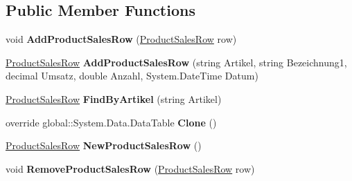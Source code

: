 \subsection*{Public Member Functions}
\begin{DoxyCompactItemize}
\item 
void {\bfseries Add\+Product\+Sales\+Row} (\hyperlink{class_products_1_1_data_1_1ds_sage_1_1_product_sales_row}{Product\+Sales\+Row} row)\hypertarget{class_products_1_1_data_1_1ds_sage_1_1_product_sales_data_table_afc99a0a7a97b04db18da66f97cf320fb}{}\label{class_products_1_1_data_1_1ds_sage_1_1_product_sales_data_table_afc99a0a7a97b04db18da66f97cf320fb}

\item 
\hyperlink{class_products_1_1_data_1_1ds_sage_1_1_product_sales_row}{Product\+Sales\+Row} {\bfseries Add\+Product\+Sales\+Row} (string Artikel, string Bezeichnung1, decimal Umsatz, double Anzahl, System.\+Date\+Time Datum)\hypertarget{class_products_1_1_data_1_1ds_sage_1_1_product_sales_data_table_a00506b08e911f017c3bbc8a0c04ba66a}{}\label{class_products_1_1_data_1_1ds_sage_1_1_product_sales_data_table_a00506b08e911f017c3bbc8a0c04ba66a}

\item 
\hyperlink{class_products_1_1_data_1_1ds_sage_1_1_product_sales_row}{Product\+Sales\+Row} {\bfseries Find\+By\+Artikel} (string Artikel)\hypertarget{class_products_1_1_data_1_1ds_sage_1_1_product_sales_data_table_a7a9689b847928fd277148f21cb8829c8}{}\label{class_products_1_1_data_1_1ds_sage_1_1_product_sales_data_table_a7a9689b847928fd277148f21cb8829c8}

\item 
override global\+::\+System.\+Data.\+Data\+Table {\bfseries Clone} ()\hypertarget{class_products_1_1_data_1_1ds_sage_1_1_product_sales_data_table_aadfeab5b05174ab21d3538e357a740bc}{}\label{class_products_1_1_data_1_1ds_sage_1_1_product_sales_data_table_aadfeab5b05174ab21d3538e357a740bc}

\item 
\hyperlink{class_products_1_1_data_1_1ds_sage_1_1_product_sales_row}{Product\+Sales\+Row} {\bfseries New\+Product\+Sales\+Row} ()\hypertarget{class_products_1_1_data_1_1ds_sage_1_1_product_sales_data_table_a96ec3ea679dd243e3b865ef51ae29018}{}\label{class_products_1_1_data_1_1ds_sage_1_1_product_sales_data_table_a96ec3ea679dd243e3b865ef51ae29018}

\item 
void {\bfseries Remove\+Product\+Sales\+Row} (\hyperlink{class_products_1_1_data_1_1ds_sage_1_1_product_sales_row}{Product\+Sales\+Row} row)\hypertarget{class_products_1_1_data_1_1ds_sage_1_1_product_sales_data_table_a27e1a4232b134574baf250418b14b460}{}\label{class_products_1_1_data_1_1ds_sage_1_1_product_sales_data_table_a27e1a4232b134574baf250418b14b460}

\end{DoxyCompactItemize}
